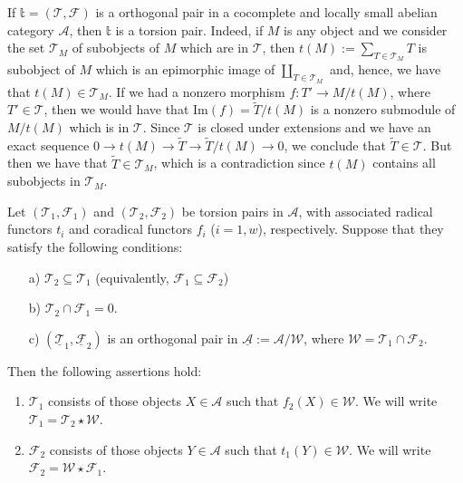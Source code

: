 \sepline

If $\mathbb{t}=(\mathcal{T},\mathcal{F})$ is a orthogonal pair in a
cocomplete and locally small abelian category $\mathcal{A}$, then
$\mathbb{t}$ is a torsion pair. Indeed, if $M$ is any object and we
consider the set $\mathcal{T}_M$ of subobjects of $M$ which are in
$\mathcal{T}$, then $t(M):=\sum_{T\in\mathcal{T}_M}T$ is subobject of
$M$ which is an epimorphic image of $\coprod_{T\in\mathcal{T}_M}$ and,
hence, we have that $t(M)\in\mathcal{T}_M$. If we had a nonzero morphism
$f:T'\longrightarrow M/t(M)$, where $T'\in\mathcal{T}$, then we would
have that $\text{Im}(f)=\tilde{T}/t(M)$ is a nonzero submodule of
$M/t(M)$ which is in $\mathcal{T}$. Since $\mathcal{T}$ is closed under
extensions and we have an exact sequence $0\rightarrow
t(M)\longrightarrow\tilde{T}\longrightarrow \tilde{T}/t(M)\rightarrow
0$, we conclude that $\tilde{T}\in\mathcal{T}$. But then we have that
$\tilde{T}\in\mathcal{T}_M$, which is a contradiction since $t(M)$
contains all subobjects in $\mathcal{T}_M$.

\sepline

\begin{lemma}
  Let $(\mathcal{T}_1,\mathcal{F}_1)$ and
$(\mathcal{T}_2,\mathcal{F}_2)$ be torsion pairs in $\mathcal{A}$, with
associated radical functors $t_i$ and coradical functors $f_i$
($i=1,w$), respectively. Suppose that they satisfy the following conditions:
    \begin{enumerate}
    \item[a)] $\mathcal{T}_2\subseteq\mathcal{T}_1$ (equivalently,
$\mathcal{F}_1\subseteq\mathcal{F}_2$)
    \item[b)] $\mathcal{T}_2\cap\mathcal{F}_1=0$.
    \item[c)] $(\underline{\mathcal{T}}_1,\underline{\mathcal{F}}_2)$ is an orthogonal pair in $\underline{\mathcal{A}}:=\mathcal{A}/\mathcal{W}$,
where  $\mathcal{W}=\mathcal{T}_1\cap\mathcal{F}_2$.
    \end{enumerate}
    Then the
following assertions hold:

    \begin{enumerate}
    \item $\mathcal{T}_1$ consists of those objects $X\in\mathcal{A}$
such that $f_2(X)\in\mathcal{W}$. We will write
$\mathcal{T}_1=\mathcal{T}_2\star\mathcal{W}$.
    \item $\mathcal{F}_2$ consists of those objects $Y\in\mathcal{A}$
such that $t_1(Y)\in\mathcal{W}$. We will write
$\mathcal{F}_2=\mathcal{W}\star\mathcal{F}_1$.
    \end{enumerate}

\end{lemma}

